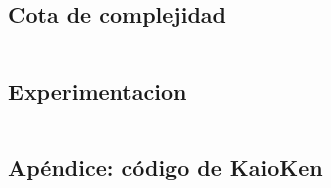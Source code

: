 \documentclass[10pt,a4paper]{article}
\begin{document}
\subsection{Cota de complejidad}
\begin{verbatim}

\end{verbatim}



\subsection{Experimentacion}
\begin{verbatim}
\end{verbatim}

\newpage
\subsection{Apéndice: código de KaioKen}
\begin{lstlisting}

\end{lstlisting}
\end{document}
